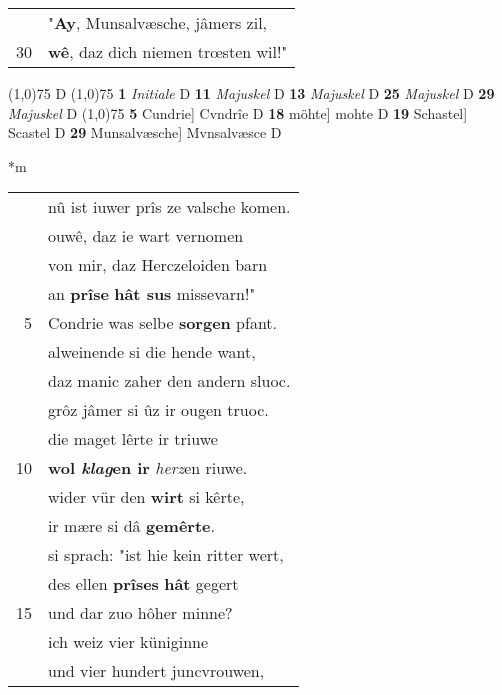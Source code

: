 \documentclass[8pt,a4paper,notitlepage]{article}
\begin{document}
\begin{table}[ht]
\begin{minipage}[t]{0.5\linewidth}
\begin{tabular}{rl}
 & "\textbf{Ay}, Munsalvæsche, jâmers zil,\\ 
30 & \textbf{wê}, daz dich niemen trœsten wil!"\\ 
\end{tabular}
\scriptsize
\line(1,0){75} \newline
D \newline
\line(1,0){75} \newline
\textbf{1} \textit{Initiale} D  \textbf{11} \textit{Majuskel} D  \textbf{13} \textit{Majuskel} D  \textbf{25} \textit{Majuskel} D  \textbf{29} \textit{Majuskel} D  \newline
\line(1,0){75} \newline
\textbf{5} Cundrie] Cvndrîe D \textbf{18} möhte] mohte D \textbf{19} Schastel] Scastel D \textbf{29} Munsalvæsche] Mvnsalvæsce D \newline
\end{minipage}
\hspace{0.5cm}
\begin{minipage}[t]{0.5\linewidth}
\small
\begin{center}*m
\end{center}
\begin{tabular}{rl}
 & nû ist iuwer prîs ze valsche komen.\\ 
 & ouwê, daz ie wart vernomen\\ 
 & von mir, daz Herczeloiden barn\\ 
 & an \textbf{prîse} \textbf{hât sus} missevarn!"\\ 
5 & Condrie was selbe \textbf{sorgen} pfant.\\ 
 & alweinende si die hende want,\\ 
 & daz manic zaher den andern sluoc.\\ 
 & grôz jâmer si ûz ir ougen truoc.\\ 
 & die maget lêrte ir triuwe\\ 
10 & \textbf{wol \textit{klag}en ir} \textit{herz}en riuwe.\\ 
 & wider vür den \textbf{wirt} si kêrte,\\ 
 & ir mære si dâ \textbf{gemêrte}.\\ 
 & si sprach: "ist hie kein ritter wert,\\ 
 & des ellen \textbf{prîses} \textbf{hât} gegert\\ 
15 & und dar zuo hôher minne?\\ 
 & ich weiz vier küniginne\\ 
 & und vier hundert juncvrouwen,\\ 

\end{tabular}
\end{minipage}
\end{table}
\end{document}
